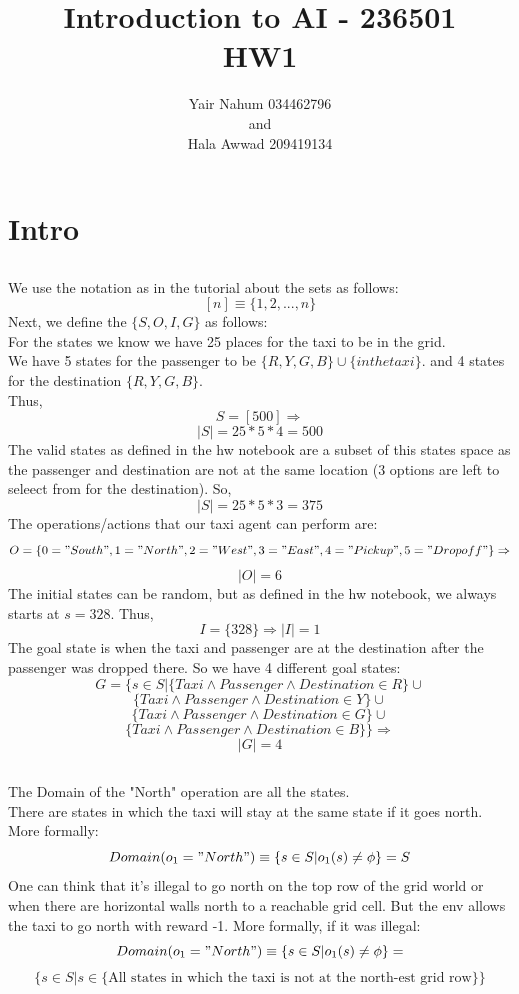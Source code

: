 \documentclass[12pt]{article}
\title{Introduction to AI - 236501\\HW1}
\author{Yair Nahum 034462796\\and\\Hala Awwad 209419134 }
\begin{document}
\maketitle


\section{Intro}

\subsection{}
We use the notation as in the tutorial about the sets as follows:\\
$$[n] \equiv \{ 1,2,...,n\}$$
Next, we define the $\{S,O,I,G\}$ as follows:\\
For the states we know we have 25 places for the taxi to be in the grid.\\
We have 5 states for the passenger to be $\{R,Y,G,B\}\cup\{in the taxi\}$.
and 4 states for the destination $\{R,Y,G,B\}$.\\
Thus, 
$$S = [500] \Rightarrow $$
$$ |S| = 25*5*4 = 500$$
The valid states as defined in the hw notebook are a subset of this states space as the passenger and destination are not at the same location (3 options are left to seleect from for the destination). So,\\
$$ |S| = 25*5*3 = 375$$
The operations/actions that our taxi agent can perform are:\\
$$O = \{0="South",1="North",2="West",3="East",4="Pickup",5="Dropoff"\}\Rightarrow$$
$$|O| = 6$$
The initial states can be random, but as defined in the hw notebook, we always starts at $s = 328$. Thus,\\
$$I=\{328\}\Rightarrow |I|=1$$
The goal state is when the taxi and passenger are at the destination after the passenger was dropped there. So we have 4 different goal states:\\

$$G=\{s\in S | \{Taxi\wedge Passenger \wedge Destination\in R\} \cup $$
$$\{Taxi\wedge Passenger \wedge Destination\in Y\} \cup $$
$$\{Taxi\wedge Passenger \wedge Destination\in G\} \cup $$
$$\{Taxi\wedge Passenger \wedge Destination\in B\} \} \Rightarrow$$
$$|G|=4$$
\subsection{}
The Domain of the "North" operation are all the states.\\
There are states in which the taxi will stay at the same state if it goes north.\\
More formally:
$$Domain(o_1="North")\equiv\{s\in S | o_1(s)\neq \phi\} = S$$
One can think that it's illegal to go north on the top row of the grid world or when  there are horizontal walls north to a reachable grid cell. But the env allows the taxi to go north with reward -1.
More formally, if it was illegal:\\
$$Domain(o_1="North")\equiv\{s\in S | o_1(s)\neq \phi\} = $$
$$\{s\in S |s\in \{\text{All states in which the taxi is not at the north-est grid row} \}\}$$
\end{document}
